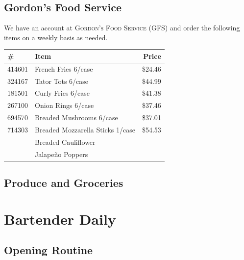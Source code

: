 \documentclass[a0,landscape]{a0poster}
\begin{document}
\begin{multicols}{4}
\subsection*{Gordon's Food Service}
We have an account at \textsc{Gordon's Food Service} (GFS) and order the following items on a weekly basis as needed.

\vspace{0.5cm}

\begin{center}
\begin{tabular}{ l l r }
\hline
\# & Item & Price \\
\hline
414601 & French Fries 6/case & \$24.46\\
324167 & Tator Tots 6/case & \$44.99\\
181501 & Curly Fries 6/case & \$41.38\\
267100 & Onion Rings 6/case & \$37.46 \\
694570 & Breaded Mushrooms 6/case  & \$37.01 \\
714303 & Breaded Mozzarella Sticks 1/case & \$54.53 \\
 & Breaded Cauliflower & \\
 & Jalape\~no Poppers & \\
 
\hline
\end{tabular}
\end{center}

\subsection*{Produce and Groceries}


\color{Navy}
\section*{Bartender Daily}


\subsection*{Opening Routine}


\end{multicols}
\end{document}
